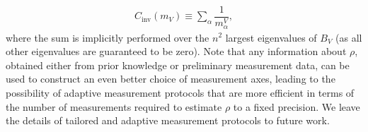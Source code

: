 \documentclass[nofootinbib,notitlepage,11pt]{revtex4-2}
\renewcommand{\t}{\text} %
\newcommand{\f}[2]{\dfrac{#1}{#2}} %
\newcommand{\p}[1]{\left(#1\right)} %
\newcommand{\1}{\mathds{1}}
\begin{document}
\begin{align}
  C_{\t{inv}}\p{m_V} \equiv \sum_\alpha \f1{m^V_\alpha},
\end{align}
where the sum is implicitly performed over the $n^2$ largest eigenvalues of $B_V$ (as all other eigenvalues are guaranteed to be zero).
Note that any information about $\rho$, obtained either from prior knowledge or preliminary measurement data, can be used to construct an even better choice of measurement axes, leading to the possibility of adaptive measurement protocols \cite{pereira2018adaptive} that are more efficient in terms of the number of measurements required to estimate $\rho$ to a fixed precision.
We leave the details of tailored and adaptive measurement protocols to future work.


\end{document}

